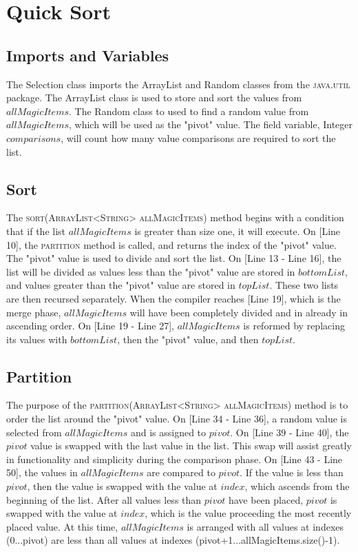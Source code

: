 \documentclass[letterpaper, 10pt,DIV=13]{scrartcl}
\begin{document}

\section{Quick Sort}

\subsection{Imports and Variables}
The Selection class imports the ArrayList and Random classes from the \textsc{java.util} package. The ArrayList class is used to store and sort the values from $allMagicItems$. The Random class to used to find a random value from $allMagicItems$, which will be used as the "pivot" value. The field variable, Integer $comparisons$, will count how many value comparisons are required to sort the list.

\subsection{Sort}
The \textsc{sort(ArrayList<String> allMagicItems)} method begins with a condition that if the list $allMagicItems$ is greater than size one, it will execute. On [Line 10], the \textsc{partition} method is called, and returns the index of the "pivot" value. The "pivot" value is used to divide and sort the list. On [Line 13 - Line 16], the list will be divided as values less than the "pivot" value are stored in $bottomList$, and values greater than the "pivot" value are stored in $topList$. These two lists are then recursed separately. When the compiler reaches [Line 19], which is the merge phase, $allMagicItems$ will have been completely divided and in already in ascending order. On [Line 19 - Line 27], $allMagicItems$ is reformed by replacing its values with $bottomList$, then the "pivot" value, and then $topList$.

\subsection{Partition}
The purpose of the \textsc{partition(ArrayList<String> allMagicItems)} method is to order the list around the "pivot" value. On [Line 34 - Line 36], a random value is selected from $allMagicItems$ and is assigned to $pivot$. On [Line 39 - Line 40], the $pivot$ value is swapped with the last value in the list. This swap will assist greatly in functionality and simplicity during the comparison phase. On [Line 43 - Line 50], the values in $allMagicItems$ are compared to $pivot$. If the value is less than $pivot$, then the value is swapped with the value at $index$, which ascends from the beginning of the list. After all values less than $pivot$ have been placed, $pivot$ is swapped with the value at $index$, which is the value proceeding the most recently placed value. At this time, $allMagicItems$ is arranged with all values at indexes (0...pivot) are less than all values at indexes (pivot+1...allMagicItems.size()-1).
\end{document}
